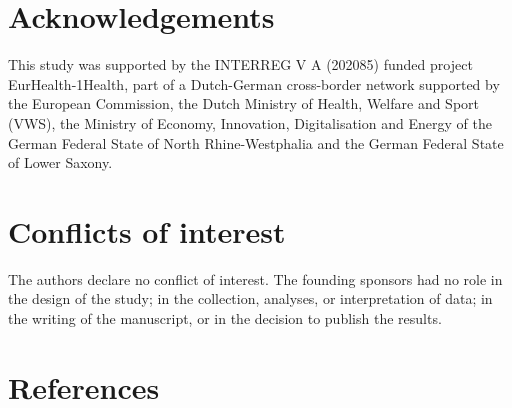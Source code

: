 \documentclass[
]{book}
\begin{document}
\hypertarget{acknowledgements-3}{%
\section*{Acknowledgements}\label{acknowledgements-3}}

This study was supported by the INTERREG V A (202085) funded project EurHealth-1Health, part of a Dutch-German cross-border network supported by the European Commission, the Dutch Ministry of Health, Welfare and Sport (VWS), the Ministry of Economy, Innovation, Digitalisation and Energy of the German Federal State of North Rhine-Westphalia and the German Federal State of Lower Saxony.

\hypertarget{conflicts-of-interest}{%
\section*{Conflicts of interest}\label{conflicts-of-interest}}

The authors declare no conflict of interest. The founding sponsors had no role in the design of the study; in the collection, analyses, or interpretation of data; in the writing of the manuscript, or in the decision to publish the results.

\hypertarget{references-7}{%
\section*{References}\label{references-7}}
\end{document}
